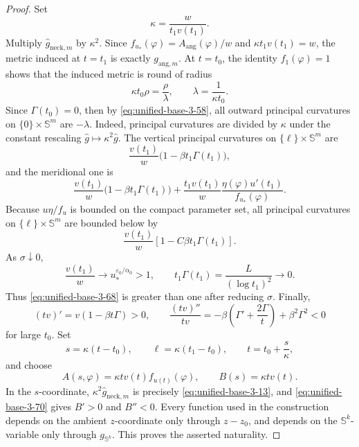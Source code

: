 \documentclass[11pt,reqno]{amsart}
\theoremstyle{definition}
\numberwithin{equation}{section}
\begin{document}
\begin{proof}

Set
\begin{equation}
\kappa=\frac{w}{t_1v(t_1)}.                                     \label{eq:unified-base-3-64}
\end{equation}
Multiply $\widehat g_{\mathrm{neck},m}$ by $\kappa^2$.  Since
$f_{u_*}(\varphi)=A_{\mathrm{ang}}(\varphi)/w$ and
$\kappa t_1v(t_1)=w$, the metric induced
at $t=t_1$ is exactly $g_{\mathrm{ang},m}$.  At $t=t_0$, the identity
$f_1(\varphi)=1$ shows that the induced metric is round of radius
\begin{equation}
\kappa t_0\rho=\frac\rho\lambda,
 \qquad \lambda=\frac1{\kappa t_0}.                             \label{eq:unified-base-3-65}
\end{equation}
Since $\Gamma(t_0)=0$, then by \eqref{eq:unified-base-3-58}, all outward principal curvatures on $\{0\}\times \mathbb S^m$
are $-\lambda$.  Indeed, principal curvatures are divided by
\(\kappa\) under the constant rescaling
\(\widehat g\mapsto\kappa^2\widehat g\).  The  vertical
principal curvatures  on $\{\ell\}\times \mathbb S^m$ are
\begin{equation}
\frac{v(t_1)}{w}\bigl(1-\beta t_1\Gamma(t_1)\bigr),             \label{eq:unified-base-3-66}
\end{equation}
and the meridional one is 
\begin{equation}
\frac{v(t_1)}{w}\bigl(1-\beta t_1\Gamma(t_1)\bigr)+\frac{t_1v(t_1)}{w}
   \frac{\eta(\varphi)u'(t_1)}{f_{u_*}(\varphi)}.                \label{eq:unified-base-3-67}
\end{equation}
Because $u\eta/f_u$ is bounded on the compact parameter set, all 
principal curvatures on $\{\ell\}\times \mathbb S^m$ are bounded below by
\begin{equation}
\frac{v(t_1)}{w}\left[1-C\beta t_1\Gamma(t_1)\right].           \label{eq:unified-base-3-68}
\end{equation}
As $\sigma\downarrow0$,
\begin{equation}
\frac{v(t_1)}{w}\longrightarrow
       u_*^{\varepsilon_0/\alpha_0}>1,\qquad
 t_1\Gamma(t_1)=\frac{L}{(\log t_1)^2}\longrightarrow0.         \label{eq:unified-base-3-69}
\end{equation}
Thus \eqref{eq:unified-base-3-68} is greater than one after reducing $\sigma$.
Finally,
\begin{equation}
(tv)'=v(1-\beta t\Gamma)>0,\qquad
 \frac{(tv)''}{tv}
 =-\beta\left(\Gamma'+\frac{2\Gamma}{t}\right)
       +\beta^2\Gamma^2<0                                        \label{eq:unified-base-3-70}
\end{equation}
for large $t_0$.  Set
\[
 s=\kappa(t-t_0),\qquad \ell=\kappa(t_1-t_0),\qquad
 t=t_0+\frac{s}{\kappa},
\]
and choose
\[
 A(s,\varphi)=\kappa tv(t)f_{u(t)}(\varphi),
 \qquad B(s)=\kappa tv(t).
\]
In the $s$-coordinate, $\kappa^2\widehat g_{\mathrm{neck},m}$ is precisely
\eqref{eq:unified-base-3-13}, and \eqref{eq:unified-base-3-70} gives $B'>0$ and $B''<0$.
Every function used in the construction depends on the ambient
\(z\)-coordinate only through \(z-z_0\), and depends on the
\(\mathbb S^k\)-variable only through \(g_{\mathbb S^k}\).  This proves
the asserted naturality.
\end{proof}
\end{document}
